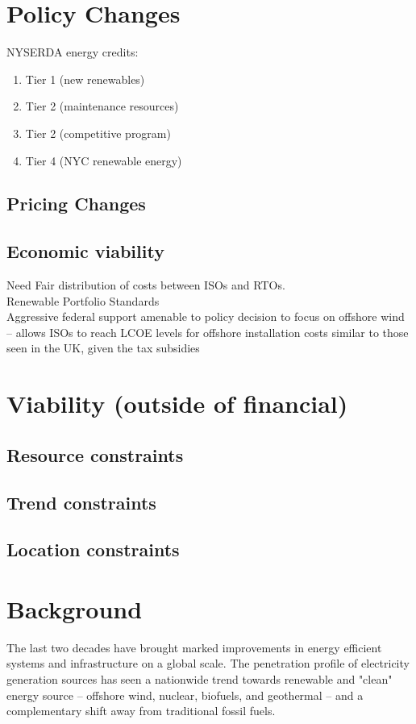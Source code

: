 \documentclass[plain]{article}
\newcommand{\1}{\mathbbm{1}}
\begin{document}
\section{Policy Changes}
NYSERDA energy credits:
	\begin{enumerate}
		\item Tier 1 (new renewables)
		\item Tier 2 (maintenance resources)
		\item Tier 2 (competitive program)
		\item Tier 4 (NYC renewable energy)
	\end{enumerate}
\subsection{Pricing Changes}
\subsection{Economic viability}
Need Fair distribution of costs between ISOs and RTOs. \cite{mitchell_review_2022}\\
Renewable Portfolio Standards\\
Aggressive federal support amenable to policy decision to focus on offshore wind -- allows ISOs to reach LCOE  levels for offshore installation costs similar to those seen in the UK, given the tax subsidies \cite{mitchell_review_2022}\\

\section{Viability (outside of financial)}
\subsection{Resource constraints}
\subsection{Trend constraints}
\subsection{Location constraints}
\section{Background}
The last two decades have brought marked improvements in energy efficient systems and infrastructure on a global scale. The penetration profile of electricity generation sources has seen a nationwide trend towards renewable and "clean" energy source -- offshore wind, nuclear, biofuels, and geothermal -- and a complementary shift away from traditional fossil fuels. 
\end{document}
